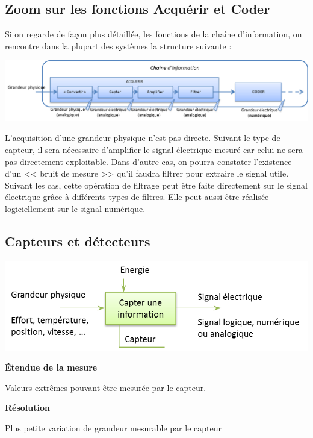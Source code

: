 \documentclass[10pt]{article}
\begin{document}
\subsection{Zoom sur les fonctions Acquérir et Coder}
Si on regarde de façon plus détaillée, les fonctions de la chaîne d'information, on rencontre dans la plupart des systèmes la structure suivante : 

\begin{center}
    \includegraphics[width=\textwidth]{images/ch_acq}
\end{center}

L'acquisition d'une grandeur physique n'est pas directe. Suivant le type de capteur, il sera nécessaire d'amplifier le signal électrique mesuré car celui ne sera pas directement exploitable. Dans d'autre cas, on pourra constater l'existence d'un << bruit de mesure >> qu'il faudra filtrer pour extraire le signal utile. Suivant les cas, cette opération de filtrage peut être faite directement sur le signal électrique grâce à différents types de filtres. Elle peut aussi être réalisée logiciellement sur le signal numérique. 


\subsection{Capteurs et détecteurs \cite{cbissprof}}

\begin{center}
    \includegraphics[width=.55\textwidth]{images/capteur}
\end{center}

\begin{defi}
\textbf{\'Etendue de la mesure}

Valeurs extrêmes pouvant être mesurée par le capteur.
\end{defi}

\begin{defi}
\textbf{Résolution}

Plus petite variation de grandeur mesurable par le capteur
\end{defi}
\end{document}
